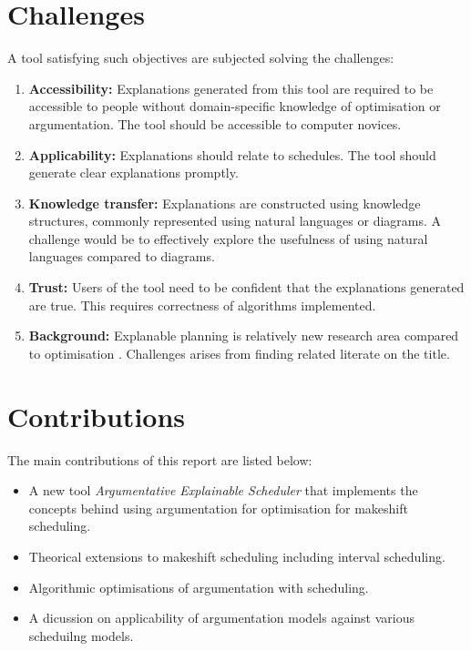 \section{Challenges}

A tool satisfying such objectives are subjected solving the challenges:
\begin{enumerate}
	\item\textbf{Accessibility:} Explanations generated from this tool are required to be accessible to people without domain-specific knowledge of optimisation or argumentation. The tool should be accessible to computer novices.
	\item\textbf{Applicability:} Explanations should relate to schedules. The tool should generate clear explanations promptly.
	\item\textbf{Knowledge transfer:} Explanations are constructed using knowledge structures, commonly represented using natural languages or diagrams. A challenge would be to effectively explore the usefulness of using natural languages compared to diagrams.
	\item\textbf{Trust:} Users of the tool need to be confident that the explanations generated are true. This requires correctness of algorithms implemented.
	\item\textbf{Background:} Explanable planning is relatively new research area compared to optimisation \cite{pe}. Challenges arises from finding related literate on the title.
\end{enumerate}

\section{Contributions}

The main contributions of this report are listed below:
\begin{itemize}
	\item A new tool \emph{Argumentative Explainable Scheduler} that implements the concepts behind using argumentation for optimisation for makeshift scheduling.
	\item Theorical extensions to makeshift scheduling including interval scheduling.
	\item Algorithmic optimisations of argumentation with scheduling.
	\item A dicussion on applicability of argumentation models against various scheduilng models.
\end{itemize}
